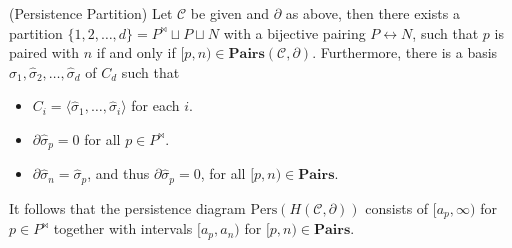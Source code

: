 \newpage
\begin{theorem}
	{(Persistence Partition) \cite[\S 2.6]{de2011dualities}} \label{persistencepartition} Let $\mathcal{C}$ be given and $\partial$ as above, then there
	exists a partition $\{1,2, \ldots, d\} = P^{\Join} \sqcup P \sqcup N$ with a bijective pairing $P \leftrightarrow N$, such that $p$ is paired with $n$ if and only if $[p,n) \in \textbf{Pairs}(\mathcal{C}, \partial)$. Furthermore, there is a basis
	$\hat{\sigma}_{1}, \hat{\sigma}_{2}, \ldots, \hat{\sigma}_{d}$ of $C_{d}$ such
	that
	\begin{itemize}
		\item $C_{i} = \langle \hat{\sigma}_{1}, \ldots, \hat{\sigma}_{i} \rangle$ for
			each $i$.
		\item $\partial\hat{\sigma}_{p} = 0$ for all $p \in P^{\Join}$.
		\item $\partial\hat{\sigma}_{n} = \hat{\sigma}_{p}$, and thus
			$\partial\hat{\sigma}_{p} = 0$, for all $[p,n) \in \textbf{Pairs}$.
	\end{itemize}
	It follows that the persistence diagram
	$\mathrm{Pers}(H(\mathcal{C},\partial))$ consists of $[a_{p}, \infty)$ for
	$p \in P^{\Join}$ together with intervals $[a_{p},a_{n})$ for
	$[p,n) \in \textbf{Pairs}$.
\end{theorem}

